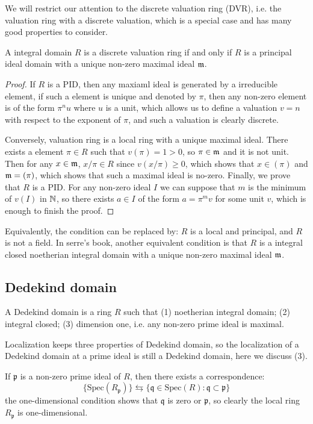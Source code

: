 We will restrict our attention to the discrete valuation ring (DVR), i.e. the valuation ring with a discrete valuation, which is a special case and has many good properties to consider.

\begin{proposition}
    A integral domain \(R\) is a discrete valuation ring if and only if \(R\) is a principal ideal domain with a unique non-zero maximal ideal \(\mathfrak{m}\).
\end{proposition}
\begin{proof}
    If \(R\) is a PID, then any maxiaml ideal is generated by a irreducible element, if such a element is unique and denoted by \(\pi\), then any non-zero element is of the form \(\pi^n u\) where \(u\) is a unit, which allows us to define a valuation \(v = n\) with respect to the exponent of \(\pi\), and such a valuation is clearly discrete.

    Conversely, valuation ring is a local ring with a unique maximal ideal. There exists a element \(\pi \in R\) such that \(v(\pi) = 1>0\), so \(\pi \in \mathfrak{m}\) and it is not unit. Then for any \(x \in \mathfrak{m}\), \(x/\pi \in R\) since \(v(x/\pi) \geq 0\), which shows that \(x \in (\pi)\) and \(\mathfrak{m} = (\pi)\), which shows that such a maximal ideal is no-zero. Finally, we prove that \(R\) is a PID. For any non-zero ideal \(I\) we can suppose that \(m\) is the minimum of \(v(I)\) in \(\mathbb{N}\), so there exists \(a \in I\) of the form \(a = \pi^m v\) for some unit \(v\), which is enough to finish the proof.
\end{proof}

\begin{remark}
    Equivalently, the condition can be replaced by: \(R\) is a local and principal, and \(R\) is not a field. In serre's book, another equivalent condition is that \(R\) is a integral closed noetherian integral domain with a unique non-zero maximal ideal \(\mathfrak{m}\).
\end{remark}

\subsection{Dedekind domain}

\begin{definition}
    A Dedekind domain is a ring \(R\) such that (1) noetherian integral domain; (2) integral closed; (3) dimension one, i.e. any non-zero prime ideal is maximal.
\end{definition}

\begin{remark}
    Localization keeps three properties of Dedekind domain, so the localization of a Dedekind domain at a prime ideal is still a Dedekind domain, here we discuss (3).

    If \(\mathfrak{p}\) is a non-zero prime ideal of \(R\), then there exists a correspondence:
    \[\{\mathrm{Spec}(R_\mathfrak{p})\} \leftrightarrows \{ \mathfrak{q} \in \mathrm{Spec}(R): \mathfrak{q}  \subset \mathfrak{p}\}\]
    the one-dimensional condition shows that \(\mathfrak{q}\) is zero or \(\mathfrak{p}\), so clearly the local ring \(R_\mathfrak{p}\) is one-dimensional.
\end{remark}

